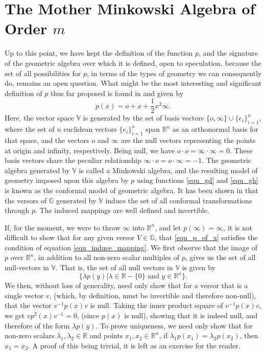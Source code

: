 \documentclass{birkjour}
\theoremstyle{definition}
\theoremstyle{remark}
\numberwithin{equation}{section}
\newcommand{\R}{\mathbb{R}}
\newcommand{\G}{\mathbb{G}}
\newcommand{\V}{\mathbb{V}}
\newcommand{\nvai}{\infty}
\newcommand{\nvao}{o}
\begin{document}
\section{The Mother Minkowski Algebra of Order $m$}

Up to this point, we have kept the definition of the function $p$, and the signature of the
geometric algebra over which it is defined,
open to speculation, because the set of all possibilities for $p$, in terms of the types of geometry
we can consequently do, remains an open question.  What might be the most interesting and significant
definition of $p$ thus far proposed is found in \cite{Hestenes01} and given by
\begin{equation}\label{equ_p_of_x}
p(x)=\nvao + x + \frac{1}{2}x^2\nvai.
\end{equation}
Here, the vector space $\V$ is generated by the set
of basis vectors $\{\nvao,\nvai\}\cup\{e_i\}_{i=1}^n$,
where the set of $n$ euclidean vectors $\{e_i\}_{i=1}^n$ span
$\R^n$ as an orthonormal basis for that space, and the
vectors $\nvao$ and $\nvai$ are the null vectors representing the
points at origin and infinity, respectively.  Being null, we have $\nvao\cdot\nvao=\nvai\cdot\nvai=0$.
These basis vectors share the peculiar relationship $\nvai\cdot\nvao=\nvao\cdot\nvai=-1$.  The geometric
algebra generated by $\V$ is called a Minkowski algebra, and the resulting model of
geometry imposed upon this algebra by $p$ using functions \eqref{equ_gd} and \eqref{equ_gh}
is known as the conformal model of geometric algebra.  It has been shown in
\cite{Hestenes01,LiRockwood01,Dorst07} that
the versors of $\G$ generated by $\V$ induce the set of all conformal transformations through $p$.
The induced mappings are well defined and invertible.

If, for the moment, we were to throw $\nvai$ into $\R^n$, and let $p(\nvai)=\nvai$, it is not difficult to show
that for any given versor $V\in\G$, that \eqref{equ_p_of_x} satisfies the condition of
equation \eqref{equ_induce_mapping}.
We first observe that the image of $p$ over $\R^n$, in addition to all non-zero scalar multiples
of $p$, gives us the set of all null-vectors in $\V$.  That is, the set of all null vectors in $\V$
is given by
\begin{equation*}
\{\lambda p(y)|\mbox{$\lambda\in\R-\{0\}$ and $y\in\R^n$}\}.
\end{equation*}
We then, without loss of generality, need only show that for a versor that is a single
vector $v$, (which, by definition, must be invertible and therefore non-null), that the
vector $v^{-1}p(x)v$ is null.  Taking the inner product square of $v^{-1}p(x)v$,
we get $vp^2(x)v^{-1}=0$, (since $p(x)$ is null), showing that it is indeed null, and therefore
of the form $\lambda p(y)$.
To prove uniqueness, we need only show that for non-zero
scalars $\lambda_1,\lambda_2\in\R$ and points $x_1,x_2\in\R^n$, if $\lambda_1p(x_1)=\lambda_2p(x_2)$,
then $x_1=x_2$.  A proof of this being trivial, it is left as an exercise for the reader.
\end{document}
